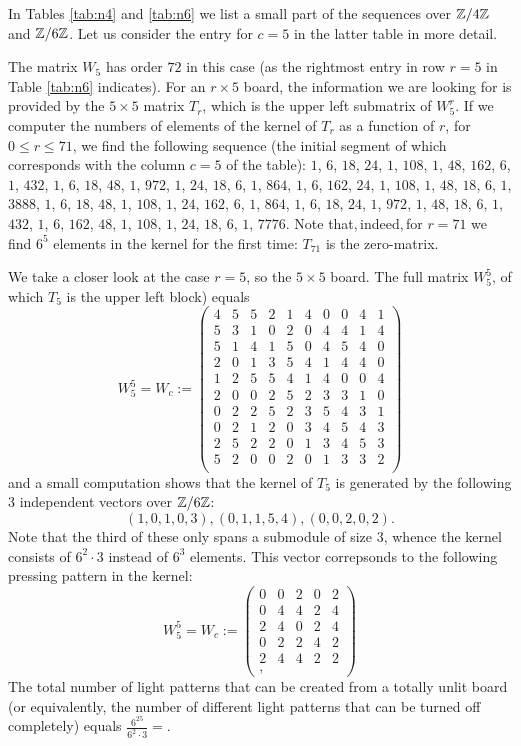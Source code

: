 \begin{example}
In Tables \ref{tab:n4} and \ref{tab:n6} we list a small part of the
sequences over $\mathbb{Z}/4\mathbb{Z}$ and $\mathbb{Z}/6\mathbb{Z}$. Let us consider the
entry for $c=5$ in the latter table in more detail.

The matrix $W_5$ has order $72$ in this case (as the rightmost entry
in row $r=5$ in Table \ref{tab:n6} indicates). For an $r\times 5$
board, the information we are looking for is provided by the
$5\times 5$ matrix $T_r$, which is the upper left submatrix of $W_5^r$.
If we computer the numbers of elements of the kernel of $T_r$ as a
function of $r$, for $0\leq r\leq 71$, we find the following
sequence (the initial segment
of which corresponds with the column $c=5$ of the table):
$1$, $6$, $18$, $24$, $1$, $108$, $1$, $48$, $162$, $6$, $1$, $432$, $1$, $6$, $18$, $48$, $1$, $972$, $1$, $24$, $18$, $
6$, $1$, $864$, $1$, $6$, $162$, $24$, $1$, $108$, $1$, $48$, $18$, $6$, $1$, $3888$, $1$, $6$, $18$, $48$, $1$, $108$, $
1$, $24$, $162$, $6$, $1$, $864$, $1$, $6$, $18$, $24$, $1$, $972$, $1$, $48$, $18$, $6$, $1$, $432$, $1$, $6$, $162$, $
48$, $1$, $108$, $1$, $24$, $18$, $6$, $1$, $7776$.
Note that$, $indeed$, $for $r=71$ we find $6^5$ elements in the kernel
for the first time: $T_{71}$ is the zero-matrix.

We take a closer look at the case $r=5$, so the $5\times 5$ board.
The full matrix $W_5^5$, of which $T_5$ is the upper left block)
equals
$$W_5^5=W_{c} := \left(
\begin{array}{cccccccccc}
4&5&5&2&1&4&0&0&4&1\\
5&3&1&0&2&0&4&4&1&4\\
5&1&4&1&5&0&4&5&4&0\\
2&0&1&3&5&4&1&4&4&0\\
1&2&5&5&4&1&4&0&0&4\\
2&0&0&2&5&2&3&3&1&0\\
0&2&2&5&2&3&5&4&3&1\\
0&2&1&2&0&3&4&5&4&3\\
2&5&2&2&0&1&3&4&5&3\\
5&2&0&0&2&0&1&3&3&2\\
\end{array}
\right)$$
and a small computation shows that the kernel of $T_5$
is generated by the following 3 independent vectors over $\mathbb{Z}/6\mathbb{Z}$:
$$(1, 0, 1, 0, 3), (0, 1, 1, 5, 4), (0, 0, 2, 0, 2).$$
Note that the third of these only spans a submodule of size $3$,
whence the kernel consists of $6^2\cdot 3$ instead of $6^3$
elements. This vector correpsonds to the following
pressing pattern in the kernel:
$$W_5^5=W_{c} := \left(
\begin{array}{cccccccccc}
0&0&2&0&2\\
0&4&4&2&4\\
2&4&0&2&4\\
0&2&2&4&2\\
2&4&4&2&2\\,
\end{array}
\right)$$
The total number of light patterns that can be created from
a totally unlit board (or equivalently, the number of different
light patterns that can be turned off completely) equals 
$\frac{6^{25}}{6^2\cdot 3}=$.
\end{example}
